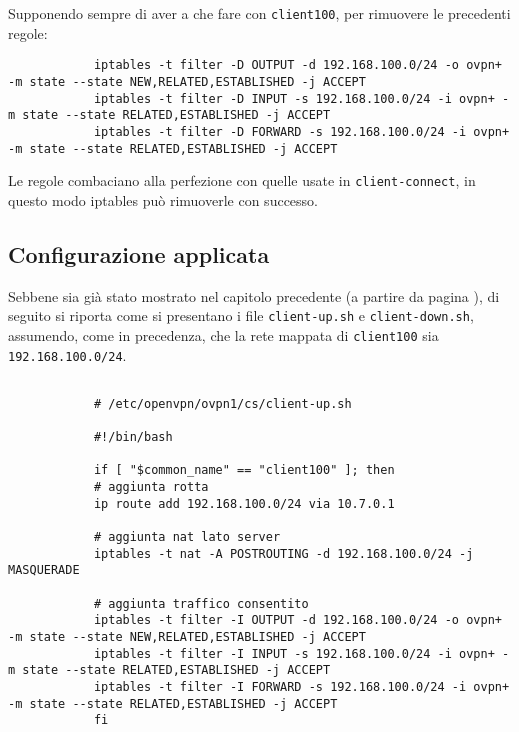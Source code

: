 		Supponendo sempre di aver a che fare con \texttt{client100}, per rimuovere le precedenti regole:
		\begin{verbatim}
			iptables -t filter -D OUTPUT -d 192.168.100.0/24 -o ovpn+ -m state --state NEW,RELATED,ESTABLISHED -j ACCEPT
			iptables -t filter -D INPUT -s 192.168.100.0/24 -i ovpn+ -m state --state RELATED,ESTABLISHED -j ACCEPT
			iptables -t filter -D FORWARD -s 192.168.100.0/24 -i ovpn+ -m state --state RELATED,ESTABLISHED -j ACCEPT   
		\end{verbatim}
		Le regole combaciano alla perfezione con quelle usate in \texttt{client-connect}, in questo modo
		iptables può rimuoverle con successo.
		        
		
		\subsection{Configurazione applicata}
		Sebbene sia già stato mostrato nel capitolo precedente (a partire da pagina \pageref{sec:ending}),
		di seguito si riporta come si presentano i file \texttt{client-up.sh} e \texttt{client-down.sh},
		assumendo, come in precedenza, che la rete mappata di \texttt{client100} sia \texttt{192.168.100.0/24}.
		
		\begin{verbatim}
			
			# /etc/openvpn/ovpn1/cs/client-up.sh
			
			#!/bin/bash
			                
			if [ "$common_name" == "client100" ]; then
			# aggiunta rotta
			ip route add 192.168.100.0/24 via 10.7.0.1
			
			# aggiunta nat lato server
			iptables -t nat -A POSTROUTING -d 192.168.100.0/24 -j MASQUERADE
			        
			# aggiunta traffico consentito
			iptables -t filter -I OUTPUT -d 192.168.100.0/24 -o ovpn+ -m state --state NEW,RELATED,ESTABLISHED -j ACCEPT
			iptables -t filter -I INPUT -s 192.168.100.0/24 -i ovpn+ -m state --state RELATED,ESTABLISHED -j ACCEPT
			iptables -t filter -I FORWARD -s 192.168.100.0/24 -i ovpn+ -m state --state RELATED,ESTABLISHED -j ACCEPT
			fi
		\end{verbatim}
		        
